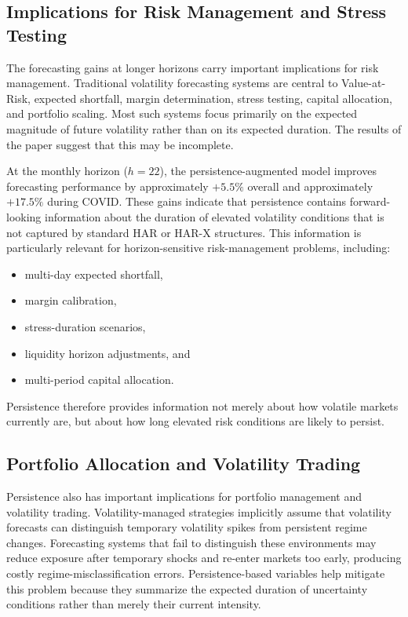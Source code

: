 \documentclass[unnumsec,webpdf,contemporary,large]{oup-authoring-template}%
\theoremstyle{thmstyleone}%
\theoremstyle{thmstyletwo}%
\theoremstyle{thmstylethree}%
\begin{document}
\subsection{Implications for Risk Management and Stress Testing}

The forecasting gains at longer horizons carry important implications for
risk management. Traditional volatility forecasting systems are central to
Value-at-Risk, expected shortfall, margin determination, stress testing,
capital allocation, and portfolio scaling. Most such systems focus
primarily on the expected magnitude of future volatility rather than on its
expected duration. The results of the paper suggest that this may be
incomplete.

At the monthly horizon ($h=22$), the persistence-augmented model improves
forecasting performance by approximately $+5.5\%$ overall and approximately
$+17.5\%$ during COVID. These gains indicate that persistence contains
forward-looking information about the duration of elevated volatility
conditions that is not captured by standard HAR or HAR-X structures. This
information is particularly relevant for horizon-sensitive risk-management
problems, including:
\begin{itemize}
  \item multi-day expected shortfall,
  \item margin calibration,
  \item stress-duration scenarios,
  \item liquidity horizon adjustments, and
  \item multi-period capital allocation.
\end{itemize}
Persistence therefore provides information not merely about how volatile
markets currently are, but about how long elevated risk conditions are
likely to persist.

\subsection{Portfolio Allocation and Volatility Trading}

Persistence also has important implications for portfolio management and
volatility trading. Volatility-managed strategies implicitly assume that
volatility forecasts can distinguish temporary volatility spikes from
persistent regime changes. Forecasting systems that fail to distinguish
these environments may reduce exposure after temporary shocks and re-enter
markets too early, producing costly regime-misclassification errors.
Persistence-based variables help mitigate this problem because they
summarize the expected duration of uncertainty conditions rather than
merely their current intensity.
\end{document}
